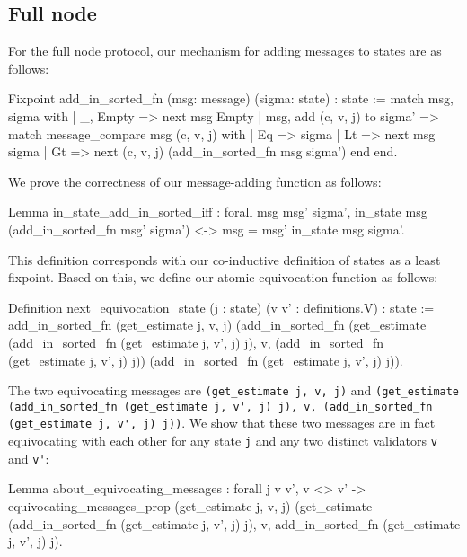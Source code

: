 \documentclass[runningheads]{llncs}
\begin{document}
\subsection{Full node} 
For the full node protocol, our mechanism for adding messages to states are as follows: 
\begin{coq}
Fixpoint add_in_sorted_fn (msg: message) (sigma: state) : state :=
match msg, sigma with
| _, Empty => next msg Empty
| msg, add (c, v, j) to sigma' =>
match message_compare msg (c, v, j) with
| Eq => sigma
| Lt => next msg sigma
| Gt => next (c, v, j) (add_in_sorted_fn msg sigma')
end
end.
\end{coq}
We prove the correctness of our message-adding function as follows: 
\begin{coq}
Lemma in_state_add_in_sorted_iff : forall msg msg' sigma',
	in_state msg (add_in_sorted_fn msg' sigma') <->
	msg = msg' \/ in_state msg sigma'.
\end{coq}
This definition corresponds with our co-inductive definition of states as a least fixpoint. Based on this, we define our atomic equivocation function as follows: 
\begin{coq}
Definition next_equivocation_state (j : state) (v v' : definitions.V) : state :=
	add_in_sorted_fn
	(get_estimate j, v, j)
	(add_in_sorted_fn
	(get_estimate (add_in_sorted_fn (get_estimate j, v', j) j), v, (add_in_sorted_fn (get_estimate j, v', j) j))
	(add_in_sorted_fn (get_estimate j, v', j) j)).	
\end{coq}
The two equivocating messages are \verb|(get_estimate j, v, j)| and \verb|(get_estimate (add_in_sorted_fn (get_estimate j, v', j) j), v, (add_in_sorted_fn (get_estimate j, v', j) j))|. We show that these two messages are in fact equivocating with each other for any state \verb|j| and any two distinct validators \verb|v| and \verb|v'|: 
\begin{coq}
Lemma about_equivocating_messages :
	forall j v v',
	v <> v' ->  
	equivocating_messages_prop (get_estimate j, v, j)
	(get_estimate (add_in_sorted_fn (get_estimate j, v', j) j), v, add_in_sorted_fn (get_estimate j, v', j) j). 
\end{coq}
\end{document}

